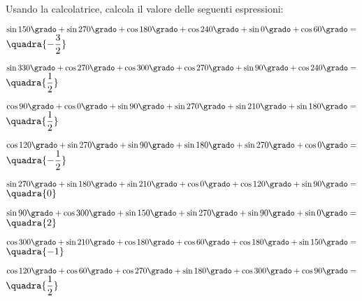 \subsubsection*{}

\begin{esercizio}\label{ese:}
 Usando la calcolatrice, calcola il valore delle seguenti espressioni:
 \begin{enumeratea}
  \item  \(\sin 150 \grado+ \sin 270 \grado+ \cos 180 \grado+ 
          \cos 240 \grado+ \sin 0 \grado+ \cos 60 \grado= \)
   \hfill \(\quadra{-\dfrac{3}{2}}\)
  \item  \(\sin 330 \grado+ \cos 270 \grado+ \cos 300 \grado+ 
          \cos 270 \grado+ \sin 90 \grado+ \cos 240 \grado= \)
   \hfill \(\quadra{\dfrac{1}{2}}\)
  \item  \(\cos 90 \grado + \cos 0 \grado + \sin 90 \grado + 
          \sin 270 \grado + \sin 210 \grado + \sin 180 \grado = \)
   \hfill \(\quadra{\dfrac{1}{2}}\)
  \item  \(\cos 120 \grado + \sin 270 \grado + \sin 90 \grado + 
          \sin 180 \grado + \sin 270 \grado + \cos 0 \grado = \)
   \hfill \(\quadra{-\dfrac{1}{2}}\)
  \item  \(\sin 270 \grado + \sin 180 \grado + \sin 210 \grado + 
          \cos 0 \grado + \cos 120 \grado + \sin 90 \grado = \)
   \hfill \(\quadra{0}\)
  \item  \(\sin 90 \grado + \cos 300 \grado + \sin 150 \grado + 
          \sin 270 \grado + \sin 90 \grado + \sin 0 \grado = \)
   \hfill \(\quadra{2}\)
  \item  \(\cos 300 \grado + \sin 210 \grado + \cos 180 \grado + 
          \cos 60 \grado + \cos 180 \grado + \sin 150 \grado = \)
   \hfill \(\quadra{-1}\)
  \item  \(\cos 120 \grado + \cos 60 \grado + \cos 270 \grado + 
          \sin 180 \grado + \cos 300 \grado + \cos 90 \grado = \)
   \hfill \(\quadra{\dfrac{1}{2}}\)

\end{enumeratea}
\end{esercizio}
